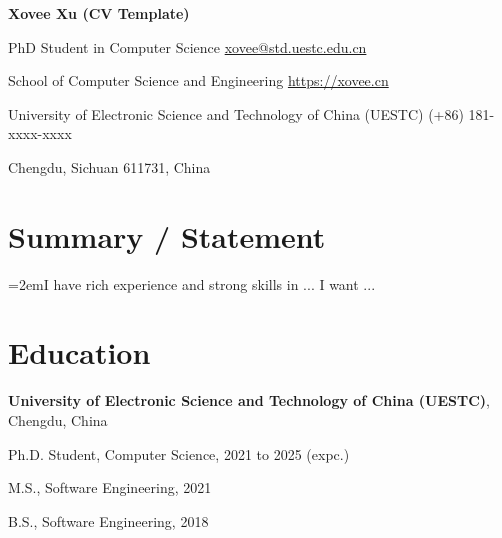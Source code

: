 \documentclass{article}
\begin{document}
\begin{center}
    \vspace*{5pt}
    \Huge{
    \textbf{Xovee Xu (CV Template)}}
\end{center}
\vspace{15pt}




\setlength{\parskip}{1pt}

\noindent PhD Student in Computer Science \hfill \href{mailto:xovee@std.uestc.edu.cn}{xovee@std.uestc.edu.cn}

\noindent School of Computer Science and Engineering \hfill \url{https://xovee.cn}

\noindent University of Electronic Science and Technology of China (UESTC) \hfill (+86) 181-xxxx-xxxx

\noindent Chengdu, Sichuan 611731, China

\setlength{\parskip}{3pt}




\section*{Summary / Statement}
\indent

\hangindent=2emI have rich experience and strong skills in ... I want ...


\section*{Education}
\indent 

\textbf{University of Electronic Science and Technology of China (UESTC)}, Chengdu, China

\hspace{2em}Ph.D. Student, Computer Science, 2021 to 2025 (expc.)

\hspace{2em}M.S., Software Engineering, 2021

\hspace{2em}B.S., Software Engineering, 2018





\end{document}

